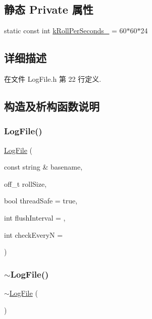 \subsection*{静态 Private 属性}
\begin{DoxyCompactItemize}
\item 
static const int \hyperlink{classmuduo_1_1LogFile_aaabf583843acb84a712a959bc753a1df}{k\+Roll\+Per\+Seconds\+\_\+} = 60$\ast$60$\ast$24
\end{DoxyCompactItemize}


\subsection{详细描述}


在文件 Log\+File.\+h 第 22 行定义.



\subsection{构造及析构函数说明}
\mbox{\label{classmuduo_1_1LogFile_a1d0d3a0ba969ef3f1471af62aed2f1f6}} 
\subsubsection{\texorpdfstring{Log\+File()}{LogFile()}}
{\footnotesize\ttfamily \hyperlink{classmuduo_1_1LogFile}{Log\+File} (\begin{DoxyParamCaption}\item[{const string \&}]{basename,  }\item[{off\+\_\+t}]{roll\+Size,  }\item[{bool}]{thread\+Safe = {\ttfamily true},  }\item[{int}]{flush\+Interval = {},  }\item[{int}]{check\+EveryN = {} }\end{DoxyParamCaption})}

\mbox{\label{classmuduo_1_1LogFile_a9789bd34990afddd14d01824e61da5bf}} 
\subsubsection{\texorpdfstring{$\sim$\+Log\+File()}{~LogFile()}}
{\footnotesize\ttfamily $\sim$\hyperlink{classmuduo_1_1LogFile}{Log\+File} (\begin{DoxyParamCaption}{ }\end{DoxyParamCaption})}



